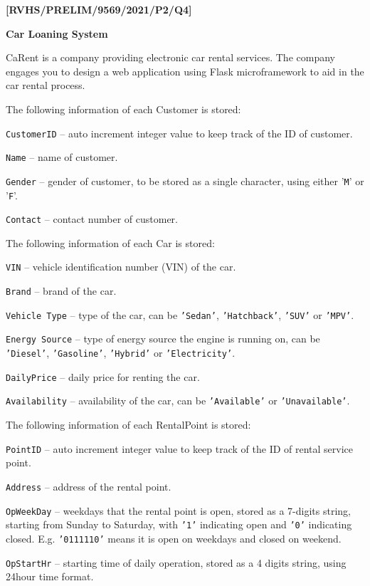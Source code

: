\item \textbf{{[}RVHS/PRELIM/9569/2021/P2/Q4{]} }

\textbf{Car Loaning System }

CaRent is a company providing electronic car rental services. The
company engages you to design a web application using Flask microframework
to aid in the car rental process. 

The following information of each Customer is stored: 

\texttt{CustomerID} -- auto increment integer value to keep track
of the ID of customer. 

\texttt{Name} -- name of customer. 

\texttt{Gender} -- gender of customer, to be stored as a single character,
using either '\texttt{M}' or '\texttt{F}'. 

\texttt{Contact} -- contact number of customer. 

The following information of each Car is stored: 

\texttt{VIN} -- vehicle identification number (VIN) of the car. 

\texttt{Brand} -- brand of the car. 

\texttt{Vehicle Type} -- type of the car, can be \texttt{'Sedan'},
\texttt{'Hatchback'}, \texttt{'SUV'} or \texttt{'MPV'}. 

\texttt{Energy Source} -- type of energy source the engine is running
on, can be \texttt{'Diesel'}, \texttt{'Gasoline'}, \texttt{'Hybrid'}
or \texttt{'Electricity'}. 

\texttt{DailyPrice} -- daily price for renting the car. 

\texttt{Availability} -- availability of the car, can be \texttt{'Available'}
or \texttt{'Unavailable'}. 

The following information of each RentalPoint is stored: 

\texttt{PointID} -- auto increment integer value to keep track of
the ID of rental service point.

\texttt{Address} -- address of the rental point. 

\texttt{OpWeekDay} -- weekdays that the rental point is open, stored
as a 7-digits string, starting from Sunday to Saturday, with \texttt{'1'}
indicating open and \texttt{'0'} indicating closed. E.g. \texttt{'0111110'}
means it is open on weekdays and closed on weekend. 

\texttt{OpStartHr} -- starting time of daily operation, stored as
a 4 digits string, using 24hour time format. 

